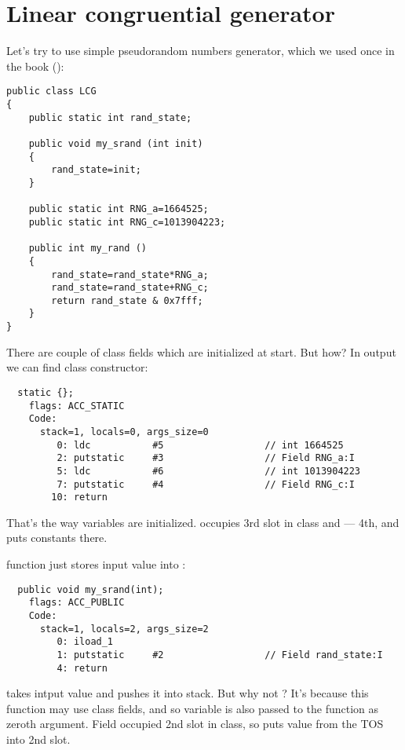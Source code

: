 \section{Linear congruential generator}

Let's try to use simple pseudorandom numbers generator, 
which we used once in the book ():

\begin{lstlisting}
public class LCG 
{
	public static int rand_state;

	public void my_srand (int init)
	{
		rand_state=init;
	}

	public static int RNG_a=1664525;
	public static int RNG_c=1013904223;

	public int my_rand ()
	{
		rand_state=rand_state*RNG_a;
		rand_state=rand_state+RNG_c;
		return rand_state & 0x7fff;
	}
}
\end{lstlisting}

There are couple of class fields which are initialized at start.
But how?
In  output we can find class constructor:

\begin{lstlisting}
  static {};
    flags: ACC_STATIC
    Code:
      stack=1, locals=0, args_size=0
         0: ldc           #5                  // int 1664525
         2: putstatic     #3                  // Field RNG_a:I
         5: ldc           #6                  // int 1013904223
         7: putstatic     #4                  // Field RNG_c:I
        10: return        
\end{lstlisting}

That's the way variables are initialized.
 occupies 3rd slot in class and  --- 4th, 
and  puts constants there.

 function just stores input value into :

\begin{lstlisting}
  public void my_srand(int);
    flags: ACC_PUBLIC
    Code:
      stack=1, locals=2, args_size=2
         0: iload_1       
         1: putstatic     #2                  // Field rand_state:I
         4: return        
\end{lstlisting}

 takes intput value and pushes it into stack. But why not ?
It's because this function may use class fields, and so  variable is also passed to
the function as zeroth argument.
Field  occupied 2nd slot in class, 
so  puts value from the \ac{TOS} into 2nd slot.

